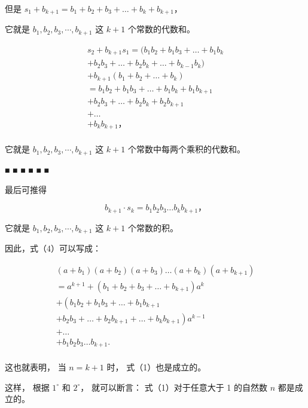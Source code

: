 但是 \(s_1+b_{k+1}=b_1+b_2+b_3+\dots+b_k+b_{k+1}\)，

它就是 \(b_{1}, b_{2}, b_{3}, \cdots, b_{k+1}\) 这 \(k+1\)
个常数的代数和。

\[
\begin{array}{l} s _ {2} + b _ {k + 1} s _ {1} = (b _ {1} b _ {2} + b _ {1} b _ {3} + \dots + b _ {1} b _ {k} \\ + b _ {2} b _ {3} + \dots + b _ {2} b _ {k} + \dots + b _ {k - 1} b _ {k}) \\ + b _ {k + 1} \left(b _ {1} + b _ {2} + \dots + b _ {k}\right) \\ = b _ {1} b _ {2} + b _ {1} b _ {3} + \dots + b _ {1} b _ {k} + b _ {1} b _ {k + 1} \\ + b _ {2} b _ {3} + \dots + b _ {2} b _ {k} + b _ {2} b _ {k + 1} \\ + \dots \\ + b _ {k} b _ {k + 1}\text{，} \\ \end{array}
\]

它就是 \(b_{1}, b_{2}, b_{3}, \cdots, b_{k+1}\) 这 \(k+1\)
个常数中每两个乘积的代数和。

■ ■ ■ ■ ■ ■

最后可推得

\[
b _ {k + 1} \cdot s _ {k} = b _ {1} b _ {2} b _ {3} \dots b _ {k} b _ {k + 1}\text{，}
\]

它就是 \(b_{1}, b_{2}, b_{3}, \cdots, b_{k+1}\) 这 \(k+1\) 个常数的积。

因此，式（4）可以写成：

\[
\begin{array}{l} (a + b _ {1}) (a + b _ {2}) (a + b _ {3}) \dots (a + b _ {k}) (a + b _ {k + 1}) \\ = a ^ {k + 1} + \left(b _ {1} + b _ {2} + b _ {3} + \dots + b _ {k + 1}\right) a ^ {k} \\ + \left(b _ {1} b _ {2} + b _ {1} b _ {3} + \dots + b _ {1} b _ {k + 1} \right. \\ \left. + b _ {2} b _ {3} + \dots + b _ {2} b _ {k + 1} + \dots + b _ {k} b _ {k + 1}\right) a ^ {k - 1} \\ + \dots \\ + b _ {1} b _ {2} b _ {3} \dots b _ {k + 1}. \\ \end{array}
\]

这也就表明， 当 \(n = k + 1\) 时， 式（1）也是成立的。

这样， 根据 \(1^{\circ}\) 和 \(2^{\circ}\)， 就可以断言：
式（1）对于任意大于 1 的自然数 \(n\) 都是成立的。

